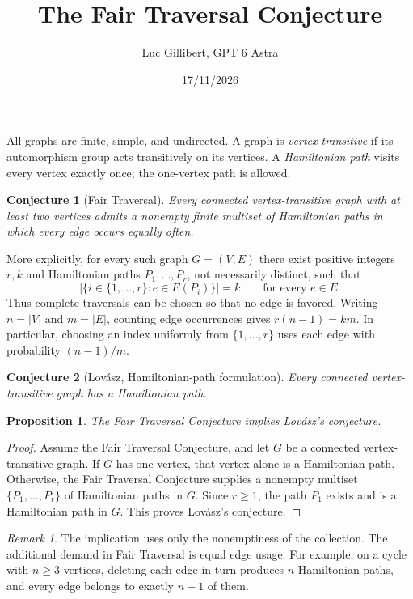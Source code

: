 \documentclass[11pt,a4paper]{article}
\title{The Fair Traversal Conjecture}
\author{Luc Gillibert, GPT 6 Astra}
\date{17/11/2026}
\newtheorem{conjecture}{Conjecture}
\newtheorem{proposition}{Proposition}
\theoremstyle{remark}
\newtheorem*{remark}{Remark}
\begin{document}
\maketitle
\vspace{-2em}

All graphs are finite, simple, and undirected. A graph is
\emph{vertex-transitive} if its automorphism group acts transitively on
its vertices. A \emph{Hamiltonian path} visits every vertex exactly
once; the one-vertex path is allowed.

\begin{conjecture}[Fair Traversal]
Every connected vertex-transitive graph with at least two vertices admits
a nonempty finite multiset of Hamiltonian paths in which every edge
occurs equally often.
\end{conjecture}

More explicitly, for every such graph $G=(V,E)$ there exist positive
integers $r,k$ and Hamiltonian paths $P_1,\ldots,P_r$, not necessarily
distinct, such that
\[
  \bigl|\{i\in\{1,\ldots,r\}:e\in E(P_i)\}\bigr|=k
  \qquad\text{for every }e\in E.
\]
Thus complete traversals can be chosen so that no edge is favored.
Writing $n=|V|$ and $m=|E|$, counting edge occurrences gives
$r(n-1)=km$. In particular, choosing an index uniformly from
$\{1,\ldots,r\}$ uses each edge with probability $(n-1)/m$.

\begin{conjecture}[Lov\'asz, Hamiltonian-path formulation]
Every connected vertex-transitive graph has a Hamiltonian path.
\end{conjecture}

\begin{proposition}
The Fair Traversal Conjecture implies Lov\'asz's conjecture.
\end{proposition}

\begin{proof}
Assume the Fair Traversal Conjecture, and let $G$ be a connected
vertex-transitive graph. If $G$ has one vertex, that vertex alone is a
Hamiltonian path. Otherwise, the Fair Traversal Conjecture supplies a
nonempty multiset $\{P_1,\ldots,P_r\}$ of Hamiltonian paths in $G$.
Since $r\geq 1$, the path $P_1$ exists and is a Hamiltonian path in $G$.
This proves Lov\'asz's conjecture.
\end{proof}

\begin{remark}
The implication uses only the nonemptiness of the collection. The
additional demand in Fair Traversal is equal edge usage. For example,
on a cycle with $n\geq 3$ vertices, deleting each edge in turn produces
$n$ Hamiltonian paths, and every edge belongs to exactly $n-1$ of them.
\end{remark}
\end{document}

